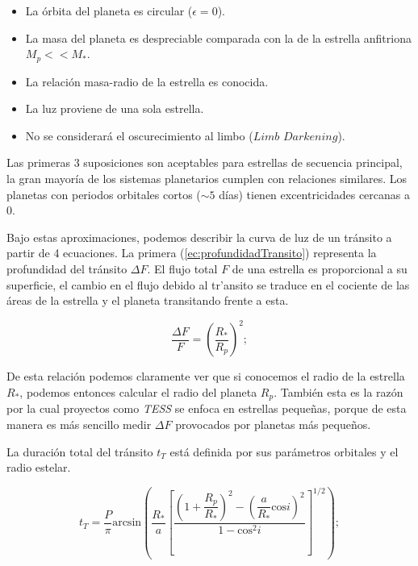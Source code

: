 \begin{itemize}
\item La órbita del planeta es circular ($\epsilon = 0$).
\item La masa del planeta es despreciable comparada con la de la estrella anfitriona \\ $M_{p} << M_{*}$.
\item La relación masa-radio de la estrella es conocida.
\item La luz proviene de una sola estrella.
\item No se considerará el oscurecimiento al limbo ($\textit{Limb Darkening}$).
\end{itemize}

Las primeras 3 suposiciones son aceptables para estrellas de secuencia principal, la gran mayoría de los sistemas planetarios cumplen con relaciones similares. Los planetas con periodos orbitales cortos ($\sim 5$ días) tienen excentricidades cercanas a 0.

Bajo estas aproximaciones, podemos describir la curva de luz de un tránsito a partir de 4 ecuaciones. La primera (\ref{ec:profundidadTransito}) representa la profundidad del tránsito $\Delta F$. El flujo total $F$ de una estrella es proporcional a su superficie, el cambio en el flujo debido al tr'ansito se traduce en el cociente de las áreas de la estrella y el planeta transitando frente a esta.

\begin{equation}
	\label{ec:profundidadTransito}
  \displaystyle \dfrac{\Delta F}{F}=\left(\dfrac{R_*}{R_p} \right)^{2} ;
\end{equation}

De esta relación podemos claramente ver que si conocemos el radio de la estrella $R_{*}$, podemos entonces calcular el radio del planeta $R_{p}$. También esta es la razón por la cual proyectos como \textit{TESS} se enfoca en estrellas pequeñas, porque de esta manera es más sencillo medir $\Delta F$ provocados por planetas más pequeños.

La duración total del tránsito $t_{T}$ está definida por sus parámetros orbitales y el radio estelar.

\begin{equation}
\label{ec:tiempoTransito}
\displaystyle t_{T}=\dfrac{P}{\pi} \mbox{arcsin} \left(\dfrac{R_{*}}{a}\left[ \dfrac{\left( 1+\dfrac{R_{p}}{R_{*}}\right)^{2}-\left( \dfrac{a}{R_{*}} \mbox{cos} i\right)^{2}}{1-\mbox{cos}^{2}i} \right]^{1/2}  \right); 
\end{equation}

